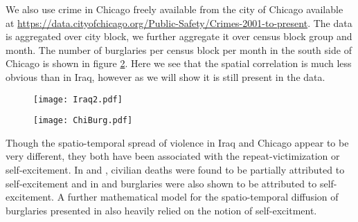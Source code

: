 \documentclass[11pt]{isuthesis}
\begin{document}
 We also use crime in Chicago freely available from the city of Chicago  available at \href{https://data.cityofchicago.org/Public-Safety/Crimes-2001-to-present}{https://data.cityofchicago.org/Public-Safety/Crimes-2001-to-present}.  The data is aggregated over city block, we further aggregate it over census block group and month.  The number of burglaries per census block per month in the south side of Chicago is shown in figure \ref{ChiSpread}.  Here we see that the spatial correlation is much less obvious than in Iraq, however as we will show it is still present in the data.

\begin{figure}[h] %
	\begin{center}
		\vspace{6pc}
		\texttt{[image: Iraq2.pdf]}
		\label{IZSpread}
	\end{center}
\end{figure} 



\begin{figure}[h] %
	\begin{center}
		\vspace{6pc}
		\texttt{[image: ChiBurg.pdf]}
		\label{ChiSpread}
	\end{center}
\end{figure} 

Though the spatio-temporal spread of violence in Iraq and Chicago appear to be very different, they both have been associated with the repeat-victimization or self-excitement.  In \cite{lewis2012self} and \cite{mohler2013modeling}, civilian deaths were found to be partially attributed to self-excitement and in \cite{mohler2011self} and \cite{mohler2013modeling} burglaries were also shown to be attributed to self-excitement.  A further mathematical model for the spatio-temporal diffusion of burglaries presented in \cite{short2008statistical} also heavily relied on the notion of self-excitment.
\end{document}
